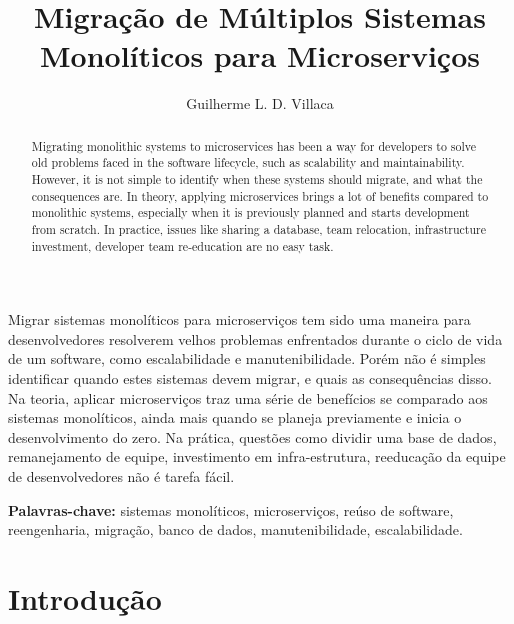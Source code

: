 \documentclass[12pt]{article}
\title{Migração de Múltiplos Sistemas Monolíticos para Microserviços}
\author{Guilherme L. D. Villaca\inst{1}}
\begin{document}
 

\maketitle

\begin{abstract}
Migrating monolithic systems to microservices has been a way for developers to solve old problems faced in the software lifecycle, such as scalability and maintainability. However, it is not simple to identify when these systems should migrate, and what the consequences are. In theory, applying microservices brings a lot of benefits compared to monolithic systems, especially when it is previously planned and starts development from scratch. In practice, issues like sharing a database, team relocation, infrastructure investment, developer team re-education are no easy task.
\end{abstract}
     
\begin{resumo} 
Migrar sistemas monolíticos para microserviços tem sido uma maneira para desenvolvedores resolverem velhos problemas enfrentados durante o ciclo de vida de um software, como escalabilidade e manutenibilidade. Porém não é simples identificar quando estes sistemas devem migrar, e quais as consequências disso. Na teoria, aplicar microserviços traz uma série de benefícios se comparado aos sistemas monolíticos, ainda mais quando se planeja previamente e inicia o desenvolvimento do zero. Na prática, questões como dividir uma base de dados, remanejamento de equipe, investimento em infra-estrutura, reeducação da equipe de desenvolvedores não é tarefa fácil.
\end{resumo}

{\bf Palavras-chave:} sistemas monolíticos, microserviços, reúso de software, reengenharia, migração, banco de dados, manutenibilidade, escalabilidade.


\section{Introdução}

\end{document}
